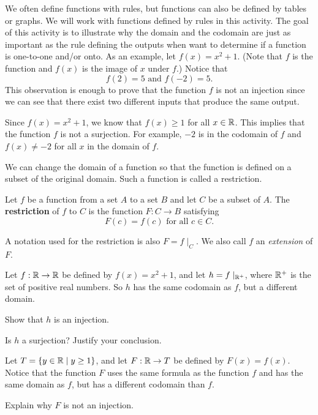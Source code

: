 \begin{pa} We often define functions with rules, but functions can also be defined by tables or graphs. We will work with functions defined by rules in this activity. The goal of this activity is to illustrate why the domain and the codomain are just as important as the rule defining the outputs when want to determine if a function is one-to-one and/or onto. As an example, let $f(x) = x^2+1$. (Note that $f$ is the function and $f(x)$ is the image of $x$ under $f$.)  Notice that
\[f(2) = 5 \text{ and } f(-2) = 5.\]
This observation is enough to prove that the function $f$ is not an injection since we can see that there exist two different inputs that produce the same output.

Since $f(x) = x^2 + 1$, we know that $f(x) \geq 1$ for all $x \in \mathbb{R}$. This implies that the function $f$ is not a surjection. For example, $-2$ is in the codomain of $f$ and $f(x) \neq -2$ for all $x$ in the domain of $f$.
\be
\item We can change the domain of a function so that the function is defined on a subset of the original domain. Such a function is called a restriction.

\begin{definition} Let $f$ be a function from a set $A$ to a set $B$ and let $C$ be a subset of $A$. The \textbf{restriction} of $f$ to $C$ is the function $F: C \to B$ satisfying
\[F(c) = f(c) \text{ for all } c \in C.\]
\end{definition}

A notation used for the restriction is also $F = f\mid_C$. We also call $f$ an \emph{extension} of $F$. 

Let $f: \mathbb{R} \to \mathbb{R}$ be defined by $f(x) = x^2+1$, and let $h = f \mid_{\mathbb{R}^+}$, where $\mathbb{R}^+$ is the set of positive real numbers. So $h$ has the same codomain as $f$, but a different domain. 
	\ba
	\item Show that $h$ is an injection.

	\item Is $h$ a surjection? Justify your conclusion.

	\ea

\item Let $T = \{y \in \mathbb{R} \mid y \geq 1\}$, and let $F: \mathbb{R} \to T$ be defined by $F(x) = f(x)$. Notice that the function $F$ uses the same formula as the function $f$ and has the same domain as $f$, but has a different codomain than $f$.
	\ba
	\item Explain why $F$ is not an injection.


\end{pa}
